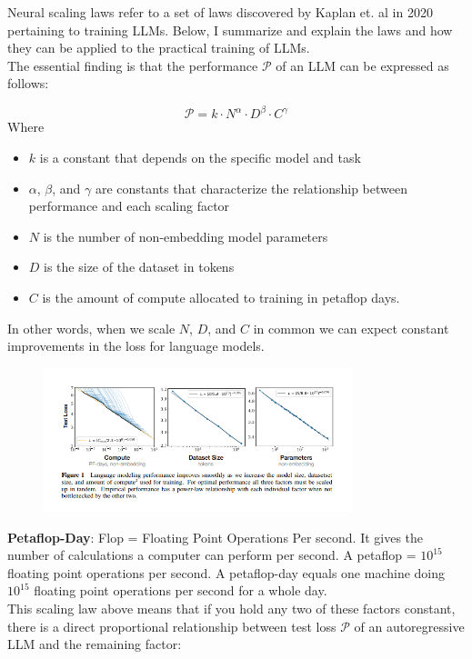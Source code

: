 \documentclass[12pt]{article}
\begin{document}
Neural scaling laws refer to a set of laws discovered by Kaplan et. al in 2020 pertaining to training LLMs. Below, I summarize and explain the laws and how they can be applied to the practical training of LLMs.\\

The essential finding is that the performance \(\mathcal{P}\) of an LLM can be expressed as follows:

\[
\mathcal{P} = k \cdot N^\alpha \cdot D^\beta \cdot C^\gamma 
\]
Where 
\begin{itemize}
\item \(k\) is a constant that depends on the specific model and task
\item \(\alpha\), \(\beta\), and \(\gamma\) are constants that characterize the relationship between performance and each scaling factor
\item \(N\) is the number of non-embedding model parameters
\item \(D\) is the size of the dataset in tokens
\item \(C\) is the amount of compute allocated to training in petaflop days. 
\end{itemize}
In other words, when we scale \(N\), \(D\), and \(C\) in common we can expect constant improvements in the loss for language models. 
\begin{figure}[H]
    \centering
    \includegraphics[width=0.8\textwidth]{./powerlaws_graph.png}
\end{figure}

\textbf{Petaflop-Day}: Flop = Floating Point Operations Per second. It gives the number of calculations a computer can perform per second. A petaflop = \(10^{15}\) floating point operations per second. A petaflop-day equals one machine doing \(10^{15}\) floating point operations per second for a whole day.\\

This scaling law above means that if you hold any two of these factors constant, there is a direct proportional relationship between test loss \(\mathcal{P}\) of an autoregressive LLM and the remaining factor:
\end{document}
